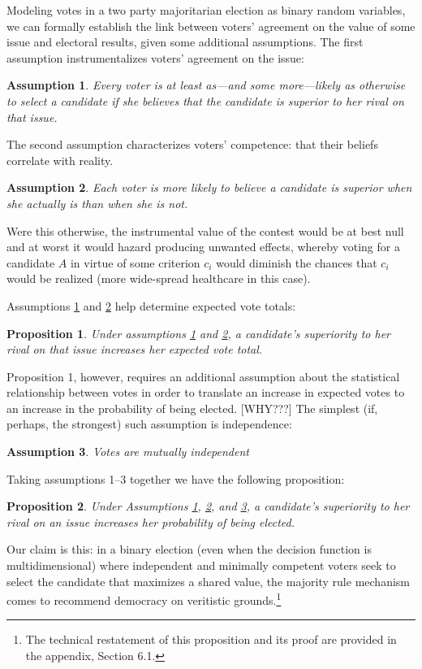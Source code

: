 \documentclass[11pt]{article}
\newtheorem{prop}{Proposition}
\newtheorem{ass}{Assumption}
\begin{document}
Modeling votes in a two party majoritarian election as
binary random variables, we can formally establish the link between voters' agreement on the value of some issue and electoral results, given some additional assumptions.
The first assumption instrumentalizes voters' agreement on the issue:
\begin{ass}\label{ass:preference}
Every voter is at least as---and some more---likely as otherwise to select a candidate if she believes  that the candidate is superior to her rival on that issue.
\end{ass}
The second assumption characterizes voters' competence: that their beliefs correlate with reality. 
\begin{ass}\label{ass:belief}%
Each voter is more likely to believe a candidate is
          superior when she actually is than when she is not. 
\end{ass}
Were this otherwise, the instrumental value of the contest would be at best null and at worst it would hazard producing unwanted effects, whereby voting for a candidate $A$ in virtue of some criterion $c_i$ would diminish the chances that $c_i$ would be realized (more wide-spread healthcare in this case).

Assumptions \ref{ass:preference} and \ref{ass:belief} help determine expected vote totals:
\begin{prop}\label{prop:voteTotal}
Under assumptions \ref{ass:preference} and \ref{ass:belief}, 
a candidate's superiority to her rival on that issue increases her expected vote total.
\end{prop}
Proposition 1, however, requires an additional assumption about the statistical relationship between votes in order to translate an increase in expected votes to an increase in the probability of being elected. [WHY???]
The simplest (if, perhaps, the strongest) such assumption is independence:
\begin{ass}\label{ass:independent}
Votes are mutually independent
\end{ass}
Taking assumptions 1--3 together we have the following proposition:
\begin{prop}
Under Assumptions \ref{ass:preference}, \ref{ass:belief}, and \ref{ass:independent}, 
a candidate's superiority to her rival on an issue increases her probability of being elected.
\end{prop}


Our claim is this: in a binary election (even when the decision function is multidimensional) where independent and minimally competent voters seek to select the candidate that maximizes a shared value, the majority rule mechanism comes to recommend democracy on veritistic grounds.\footnote{The technical restatement of this proposition and its proof are provided in the appendix, Section 6.1.}
\end{document}
